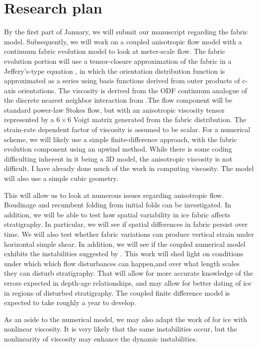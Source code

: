 \documentclass{report}
\begin{document}
\section{Research plan}
By the first part of January, we will submit our manuscript regarding the fabric model. Subsequently, we will work on a coupled anisotropic flow model with a continuum fabric evolution model to look at meter-scale flow. The fabric evolution portion will use a tensor-closure approximation of the fabric in a Jeffery's-type equation \citep{jeffery1922}, in which the orientation distribution function is approximated as a series using basis functions derived from outer products of c-axis orientations. The viscosity is derived from the ODF continuum analogue of the discrete nearest neighbor interaction from \citet{throstur2002}.The flow component will be standard power-law Stokes flow, but with an anisotropic viscosity tensor represented by a $6 \times 6$ Voigt matrix generated from the fabric distribution. The strain-rate dependent factor of viscosity is assumed to be scalar. For a numerical scheme, we will likely use a simple finite-difference approach, with the fabric evolution component using an upwind method. While there is some coding difficulting inherent in it being a 3D model, the anisotropic viscosity is not difficult. I have already done much of the work in computing viscosity. The model will also use a simple cubic geometry.

This will allow us to look at numerous issues regarding anisotropic flow. Boudinage and recumbent folding from initial folds can be investigated. In addition, we will be able to test how spatial variability in ice fabric affects stratigraphy. In particular, we will see if spatial differences in fabric persist over time. We will also test whether fabric variations can produce vertical strain under horizontal simple shear. In addition, we will see if the coupled numerical model exhibits the instabilities suggested by \citet{montgomery-smith2011}. This work will shed light on conditions under which which flow disturbances can happen,and over what length scales they can disturb stratigraphy. That will allow for more accurate knowledge of the errors expected in depth-age relationships, and may allow for better dating of ice in regions of disturbed stratigraphy. The coupled finite difference model is expected to take roughly a year to develop.

As an aside to the numerical model, we may also adapt the work of \citet{montgomery-smith2011} for ice with nonlinear viscosity. It is very likely that the same instabilities occur, but the nonlinearity of viscosity may enhance the dynamic instabilities.
\end{document}
